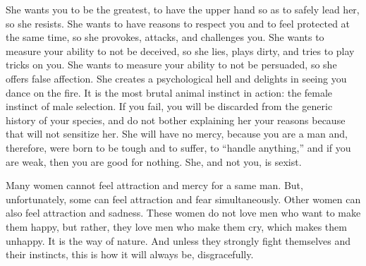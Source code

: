 \par She wants you to be the greatest, to have the upper hand so as to safely lead her, so she resists. She wants to have reasons to respect you and to feel protected at the same time, so she provokes, attacks, and challenges you. She wants to measure your ability to not be deceived, so she lies, plays dirty, and tries to play tricks on you. She wants to measure your ability to not be persuaded, so she offers false affection. She creates a psychological hell and delights in seeing you dance on the fire. It is the most brutal animal instinct in action: the female instinct of male selection. If you fail, you will be discarded from the generic history of your species, and do not bother explaining her your reasons because that will not sensitize her. She will have no mercy, because you are a man and, therefore, were born to be tough and to suffer, to \enquote{handle anything,} and if you are weak, then you are good for nothing. She, and not you, is sexist.

\par Many women cannot feel attraction and mercy for a same man. But, unfortunately, some can feel attraction and fear simultaneously. Other women can also feel attraction and sadness. These women do not love men who want to make them happy, but rather, they love men who make them cry, which makes them unhappy. It is the way of nature. And unless they strongly fight themselves and their instincts, this is how it will always be, disgracefully.